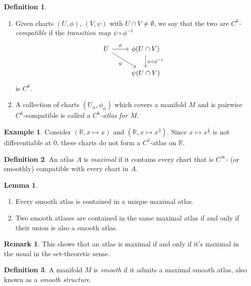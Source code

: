 \documentclass[10pt,letterpaper,cm]{nupset}
\theoremstyle{definition}
\newtheorem*{definition}{Definition}
\newtheorem{exmp}{Example}
\newtheorem{remark}{Remark}
\newtheorem{lemma}{Lemma}
\newcommand{\R}{\mathbb R}
\newcommand{\1}{\mathbf{1}}
\newcommand{\0}{\vec 0}
\begin{document}
\begin{definition} $ $
\begin{enumerate}
\item 
Given charts $(U, \phi)$, $(V, \psi)$ with $U \cap V \ne \emptyset$, we say that the two are \textit{$C^k$-compatible} if the \textit{transition map $\psi \circ \phi^{-1}$}
 \[
  \begin{tikzcd}
    U \arrow{r}{\phi} \arrow[swap]{dr}{\psi} & \phi(U\cap V) \arrow{d}{\psi \circ \phi^{-1}} \\
     & \psi(U \cap V)
  \end{tikzcd}
\]
is $C^k$.
\item A collection of charts $(U_\alpha, \phi_\alpha)$ which covers a manifold $M$ and is pairwise $C^k$-compatible is called a \textit{$C^k$-atlas for $M$}.
\end{enumerate}
\end{definition}

\begin{exmp}
Consider $(\R, x \mapsto x)$ and $(\R, x \mapsto x^3)$. Since $x \mapsto x^{\frac{1}{3}}$ is not differentiable at $0$, these charts do not form a $C^1$-atlas on $\R$.
\end{exmp}

\theoremstyle{definition}
\begin{definition}{An atlas $A$ is \textit{maximal} if it contains every chart that is $C^{\infty}$- (or smoothly) compatible with every chart in $A$.}
\end{definition}

\theoremstyle{lemma}
\begin{lemma}{} $ $


\begin{enumerate}
\item Every smooth atlas is contained in a unique maximal atlas.
\item Two smooth atlases are contained in the same maximal atlas  if and only if their union is also a smooth atlas.
\end{enumerate}

\end{lemma}



\begin{remark}{This shows that an atlas is maximal  if and only if it's maximal in the usual in the set-theoretic sense.}
\end{remark}

\theoremstyle{definition}
\begin{definition}{A manifold $M$ is \textit{smooth} if it admits a maximal smooth atlas, also known as a \textit{smooth structure}.}
\end{definition}
\end{document}
